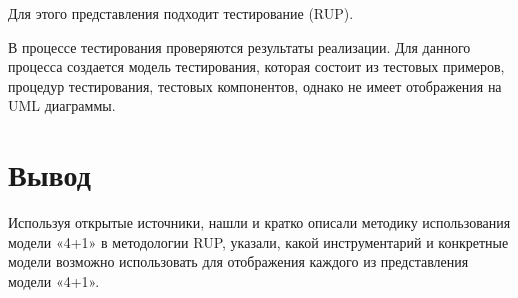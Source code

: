 Для этого представления подходит тестирование (RUP).

В процессе тестирования проверяются результаты реализации. Для данного процесса создается модель тестирования, которая состоит из тестовых примеров, процедур тестирования, тестовых компонентов, однако не имеет отображения на UML диаграммы.

\section{Вывод}

Используя открытые источники, нашли и кратко описали методику использования модели «4+1» в методологии RUP, указали, какой инструментарий и конкретные модели возможно использовать для отображения каждого из представления модели «4+1».

